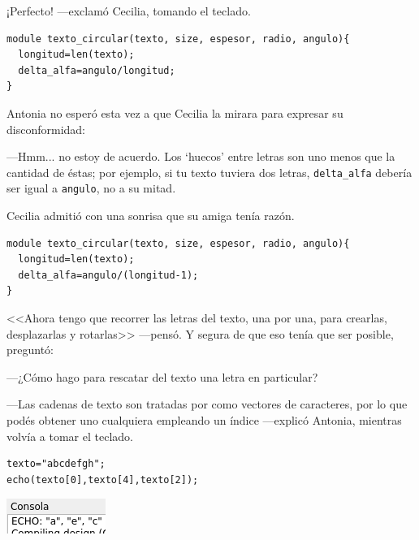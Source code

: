 ¡Perfecto! ---exclamó Cecilia, tomando el teclado.

\begin{lstlisting}
module texto_circular(texto, size, espesor, radio, angulo){
  longitud=len(texto);
  delta_alfa=angulo/longitud;
}
\end{lstlisting}

Antonia no esperó esta vez a que Cecilia la mirara para expresar su
disconformidad:

---Hmm... no estoy de acuerdo. Los `huecos' entre letras son uno menos
que la cantidad de éstas; por ejemplo, si tu texto tuviera dos letras,
\lstinline!delta_alfa! debería ser igual a \lstinline!angulo!, no a su
mitad.

Cecilia admitió con una sonrisa que su amiga tenía razón.

\begin{lstlisting}
module texto_circular(texto, size, espesor, radio, angulo){
  longitud=len(texto);
  delta_alfa=angulo/(longitud-1);
}
\end{lstlisting}

<<Ahora tengo que recorrer las letras del texto, una por una, para
crearlas, desplazarlas y rotarlas>> ---pensó. Y segura de que eso
tenía que ser posible, preguntó:

---¿Cómo hago para rescatar del texto una letra en particular?

---Las cadenas de texto son tratadas por \openscad{} como vectores de
caracteres, por lo que podés obtener uno cualquiera empleando un
índice ---explicó Antonia, mientras volvía a tomar el teclado.

\begin{center}
\begin{minipage}[]{.7\textwidth}%
 \begin{lstlisting}
texto="abcdefgh";
echo(texto[0],texto[4],texto[2]);
\end{lstlisting}%
\end{minipage}\hfill
\begin{minipage}[]{.3\textwidth}%
  \centering
  \includegraphics[width=.85\textwidth]{imagenes/echo-texto-i}
\end{minipage}
\end{center}


